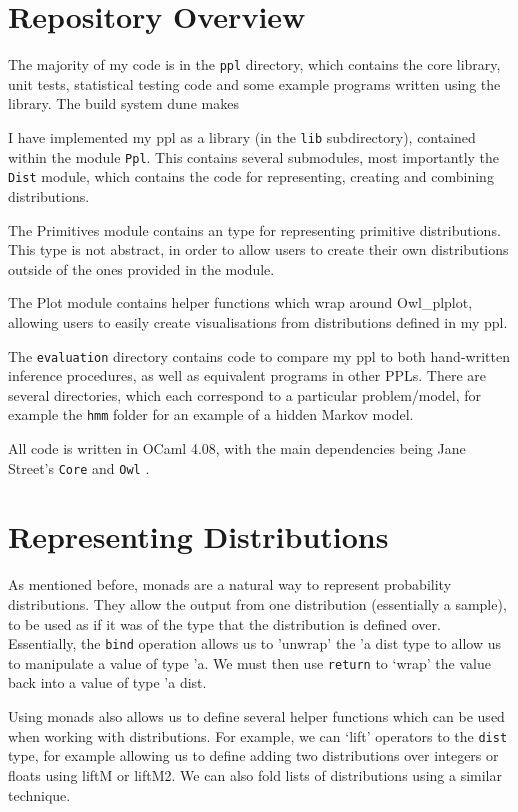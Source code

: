 \section{Repository Overview}

The majority of my code is in the \texttt{ppl} directory, which contains the core library, unit tests, statistical testing code and some example programs written using the library. The build system dune makes 


I have implemented my ppl as a library (in the \texttt{lib} subdirectory), contained within the module \texttt{Ppl}. This contains several submodules, most importantly the \texttt{Dist} module, which contains the code for representing, creating and combining distributions. 

The Primitives module contains an type for representing primitive distributions. This type is not abstract, in order to allow users to create their own distributions outside of the ones provided in the module.

The Plot module contains helper functions which wrap around Owl\_plplot, allowing users to easily create visualisations from distributions defined in my ppl.

The \texttt{evaluation} directory contains code to compare my ppl to both hand-written inference procedures, as well as equivalent programs in other PPLs. There are several directories, which each correspond to a particular problem/model, for example the \texttt{hmm} folder for an example of a hidden Markov model.

All code is written in OCaml 4.08, with the main dependencies being Jane Street's \texttt{Core} and \texttt{Owl} \cite{owl}.

\section{Representing Distributions}

As mentioned before, monads are a natural way to represent probability distributions. They allow the output from one distribution (essentially a sample), to be used as if it was of the type that the distribution is defined over. Essentially, the \texttt{bind} operation allows us to 'unwrap' the 'a dist type to allow us to manipulate a value of type 'a. We must then use \texttt{return} to `wrap' the value back into a value of type 'a dist.

Using monads also allows us to define several helper functions which can be used when working with distributions. For example, we can `lift' operators to the \texttt{dist} type, for example allowing us to define adding two distributions over integers or floats using liftM or liftM2. We can also fold lists of distributions using a similar technique.

